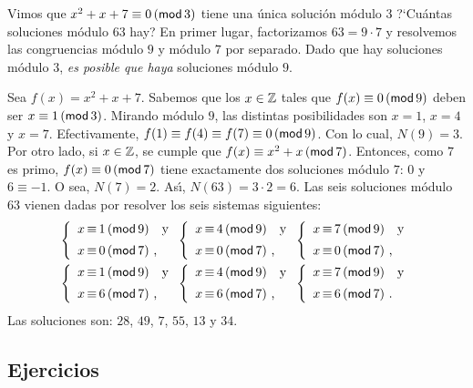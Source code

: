 \begin{ejemChino}\label{ejem:chino:polinomial:veinticiete}
	Vimos que $x^2+x+7\equiv 0\tmodulo[3]$ tiene una \'unica
	soluci\'on m\'odulo $3$ ?`Cu\'antas soluciones m\'odulo $63$ hay?
	En primer lugar, factorizamos $63=9\cdot 7$ y resolvemos
	las congruencias m\'odulo $9$ y m\'odulo $7$ por separado.
	Dado que hay soluciones m\'odulo $3$, \emph{es posible que haya}
	soluciones m\'odulo $9$.

	Sea $f(x)=x^2+x+7$. Sabemos que los $x\in\Enteros$ tales que
	$f(x)\equiv 0\tmodulo[9]$ deben ser $x\equiv 1\tmodulo[3]$.
	Mirando m\'odulo $9$, las distintas posibilidades son
	$x=1$, $x=4$ y $x=7$. Efectivamente,
	$f(1)\equiv f(4)\equiv f(7)\equiv 0\tmodulo[9]$.
	Con lo cual, $N(9)=3$.
	Por otro lado, si $x\in\Enteros$, se cumple que
	$f(x)\equiv x^2+x\tmodulo[7]$. Entonces, como $7$ es primo,
	$f(x)\equiv 0\tmodulo[7]$ tiene exactamente dos soluciones
	m\'odulo $7$: $0$ y $6\equiv -1$. O sea, $N(7)=2$.
	As\'{\i}, $N(63)=3\cdot 2=6$. Las seis soluciones m\'odulo $63$
	vienen dadas por resolver los seis sistemas siguientes:
	\begin{displaymath}
		\begin{aligned}
			\left\{
			\begin{array}{r@{\,\equiv\,}l}
				x & 1 \tmodulo[9] \dispand \\[5pt]
				x & 0 \tmodulo[7] \dispcomma
			\end{array}
			\right.
			\left\{
			\begin{array}{r@{\,\equiv\,}l}
				x & 4 \tmodulo[9] \dispand \\[5pt]
				x & 0 \tmodulo[7] \dispcomma
			\end{array}
			\right.
			\left\{
			\begin{array}{r@{\,\equiv\,}l}
				x & 7 \tmodulo[9] \dispand \\[5pt]
				x & 0 \tmodulo[7] \dispcomma
			\end{array}
			\right. \\
			\left\{
			\begin{array}{r@{\,\equiv\,}l}
				x & 1 \tmodulo[9] \dispand \\[5pt]
				x & 6 \tmodulo[7] \dispcomma
			\end{array}
			\right.
			\left\{
			\begin{array}{r@{\,\equiv\,}l}
				x & 4 \tmodulo[9] \dispand \\[5pt]
				x & 6 \tmodulo[7] \dispcomma
			\end{array}
			\right.
			\left\{
			\begin{array}{r@{\,\equiv\,}l}
				x & 7 \tmodulo[9] \dispand \\[5pt]
				x & 6 \tmodulo[7] \dispstop
			\end{array}
			\right.
		\end{aligned}
	\end{displaymath}
	Las soluciones son: $28$, $49$, $7$, $55$, $13$ y $34$.
\end{ejemChino}

\subsection*{Ejercicios}


